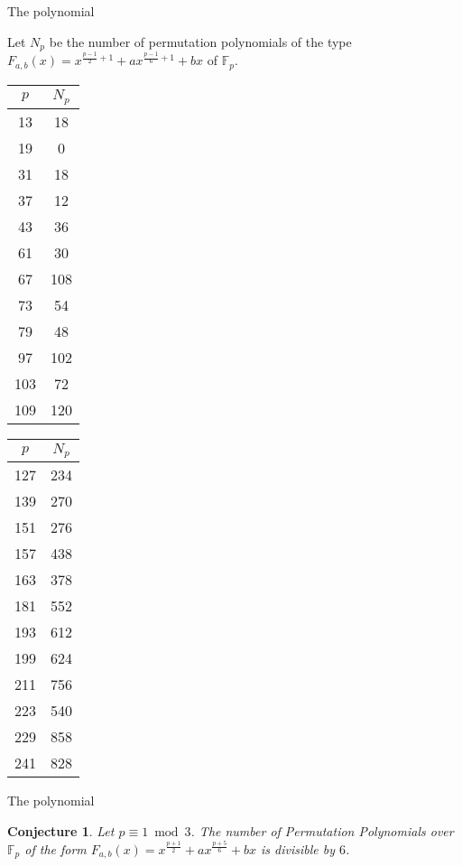 \documentclass{beamer}
\newtheorem{conjecture}{Conjecture}
\begin{document}
\begin{frame}{The polynomial}

Let $N_p$ be the number of permutation polynomials of the type $F_{a,b}(x)=x^{\frac{p-1}{2}+1}+ax^{\frac{p-1}{6}+1}+bx$ of $\mathbb{F}_{p}$.
\begin{center}
\begin{tabular}{|c|c|}\hline
  $p$ & $N_p$ \\ \hline
  13 & 18 \\ \hline
  19& 0 \\ \hline
  31 & 18  \\ \hline
  37 & 12 \\ \hline
  43 & 36 \\ \hline
  61 & 30 \\ \hline
  67 & 108 \\ \hline
  73 & 54 \\ \hline
  79 & 48 \\ \hline
  97 & 102 \\ \hline
  103 & 72 \\  \hline
  109 & 120 \\ \hline
  \end{tabular}
\begin{tabular}{|c|c|}\hline
  $p$ & $N_p$ \\ \hline
  127 & 234 \\ \hline
  139 & 270 \\ \hline
  151 &  276 \\ \hline
  157 & 438\\ \hline
  163 & 378 \\ \hline
  181 & 552 \\ \hline
  193 & 612 \\ \hline
  199 & 624 \\ \hline
  211 & 756 \\ \hline
  223 & 540 \\ \hline
  229 & 858 \\ \hline
  241 & 828 \\ \hline
  \end{tabular}
  \end{center}

\end{frame}

\begin{frame}{The polynomial}

\begin{conjecture}
Let $p \equiv 1 \bmod 3$. The number of Permutation Polynomials over $\mathbb{F}_{p}$ of the form $F_{a,b}(x)=x^{\frac{p+1}{2}} + ax^{\frac{p+5}{6}} + bx$ is divisible by $6$.
\end{conjecture}

\end{frame}
\end{document}
